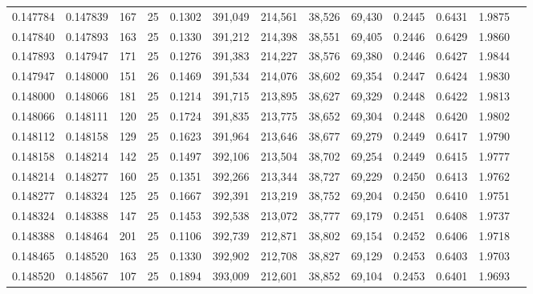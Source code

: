 \begin{tabular}{rrrrrrrrrrrrr}
0.147784 & 0.147839 &   167 &  25 &                                     0.1302 & 391,049 & 214,561 &  38,526 &  69,430 & 0.2445 & 0.6431 & 1.9875 \\
0.147840 & 0.147893 &   163 &  25 &                                     0.1330 & 391,212 & 214,398 &  38,551 &  69,405 & 0.2446 & 0.6429 & 1.9860 \\
0.147893 & 0.147947 &   171 &  25 &                                     0.1276 & 391,383 & 214,227 &  38,576 &  69,380 & 0.2446 & 0.6427 & 1.9844 \\
0.147947 & 0.148000 &   151 &  26 &                                     0.1469 & 391,534 & 214,076 &  38,602 &  69,354 & 0.2447 & 0.6424 & 1.9830 \\
0.148000 & 0.148066 &   181 &  25 &                                     0.1214 & 391,715 & 213,895 &  38,627 &  69,329 & 0.2448 & 0.6422 & 1.9813 \\
0.148066 & 0.148111 &   120 &  25 &                                     0.1724 & 391,835 & 213,775 &  38,652 &  69,304 & 0.2448 & 0.6420 & 1.9802 \\
0.148112 & 0.148158 &   129 &  25 &                                     0.1623 & 391,964 & 213,646 &  38,677 &  69,279 & 0.2449 & 0.6417 & 1.9790 \\
0.148158 & 0.148214 &   142 &  25 &                                     0.1497 & 392,106 & 213,504 &  38,702 &  69,254 & 0.2449 & 0.6415 & 1.9777 \\
0.148214 & 0.148277 &   160 &  25 &                                     0.1351 & 392,266 & 213,344 &  38,727 &  69,229 & 0.2450 & 0.6413 & 1.9762 \\
0.148277 & 0.148324 &   125 &  25 &                                     0.1667 & 392,391 & 213,219 &  38,752 &  69,204 & 0.2450 & 0.6410 & 1.9751 \\
0.148324 & 0.148388 &   147 &  25 &                                     0.1453 & 392,538 & 213,072 &  38,777 &  69,179 & 0.2451 & 0.6408 & 1.9737 \\
0.148388 & 0.148464 &   201 &  25 &                                     0.1106 & 392,739 & 212,871 &  38,802 &  69,154 & 0.2452 & 0.6406 & 1.9718 \\
0.148465 & 0.148520 &   163 &  25 &                                     0.1330 & 392,902 & 212,708 &  38,827 &  69,129 & 0.2453 & 0.6403 & 1.9703 \\
0.148520 & 0.148567 &   107 &  25 &                                     0.1894 & 393,009 & 212,601 &  38,852 &  69,104 & 0.2453 & 0.6401 & 1.9693 \\

\end{tabular}
